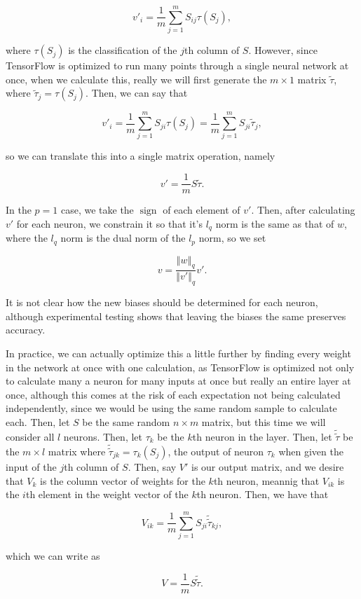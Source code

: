 \documentclass{article}
\newcommand{\norm}[1]{\left\Vert #1 \right\Vert}
\DeclareMathOperator{\sign}{sign}
\DeclareMathOperator{\1}{\mathbb{1}}
\begin{document}
$$v'_i = \frac{1}{m} \sum_{j = 1}^m S_{ij} \tau(S_j),$$

where $\tau(S_j)$ is the classification of the $j$th column of $S$. However, since TensorFlow is optimized to run many points through a single neural network at once, when we calculate this, really we will first generate the $m \times 1$ matrix $\tilde\tau$, where $\tilde\tau_j = \tau(S_j)$. Then, we can say that

$$v'_i = \frac{1}{m} \sum_{j = 1}^m S_{ji} \tau(S_j)
= \frac{1}{m} \sum_{j = 1}^m S_{ji} \tilde\tau_j,$$

so we can translate this into a single matrix operation, namely

$$v' = \frac{1}{m} S\tilde\tau.$$

In the $p = 1$ case, we take the $\sign$ of each element of $v'$. Then, after calculating $v'$ for each neuron, we constrain it so that it's $l_q$ norm is the same as that of $w$, where the $l_q$ norm is the dual norm of the $l_p$ norm, so we set

$$v = \frac{\norm{w}_q}{\norm{v'}_q}v'.$$

It is not clear how the new biases should be determined for each neuron, although experimental testing shows that leaving the biases the same preserves accuracy.

In practice, we can actually optimize this a little further by finding every weight in the network at once with one calculation, as TensorFlow is optimized not only to calculate many a neuron for many inputs at once but really an entire layer at once, although this comes at the risk of each expectation not being calculated independently, since we would be using the same random sample to calculate each. Then, let $S$ be the same random $n \times m$ matrix, but this time we will consider all $l$ neurons. Then, let $\tau_k$ be the $k$th neuron in the layer. Then, let $\tilde\tilde\tau$ be the $m \times l$ matrix where $\tilde\tilde\tau_{jk} = \tau_k(S_j)$, the output of neuron $\tau_k$ when given the input of the $j$th column of $S$. Then, say $V'$ is our output matrix, and we desire that $V_{k}$ is the column vector of weights for the $k$th neuron, meannig that $V_{ik}$ is the $i$th element in the weight vector of the $k$th neuron. Then, we have that

$$V_{ik} = \frac{1}{m}\sum_{j = 1}^m S_{ji} \tilde\tilde\tau_{kj},$$

which we can write as

$$V = \frac{1}{m} S \tilde\tilde\tau.$$
\end{document}
